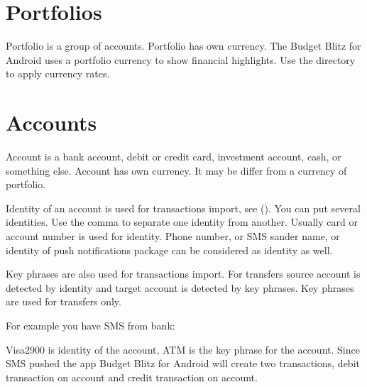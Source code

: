 \documentclass[a4paper,10pt,english]{sphinxmanual}
\begin{document}
\section{Portfolios}
\label{\detokenize{directories:portfolios}}
\sphinxAtStartPar
Portfolio is a group of accounts. Portfolio has own currency. The Budget Blitz for Android uses a portfolio currency
to show financial highlights. Use the  directory to apply currency rates.


\section{Accounts}
\label{\detokenize{directories:accounts}}
\sphinxAtStartPar
Account is a bank account, debit or credit card, investment account, cash, or something else.
Account has own currency. It may be differ from a currency of portfolio.

\sphinxAtStartPar
Identity of an account is used for transactions import, see {\hyperref[\detokenize{import:chapter-import}]{}} ().
You can put several identities. Use the comma to separate one identity from another.
Usually card or account number is used for identity. Phone number, or SMS sander name,
or identity of push notifications package can be considered as identity as well.

\sphinxAtStartPar
Key phrases are also used for transactions import. For transfers source account is detected by identity
and target account is detected by key phrases. Key phrases are used for transfers only.

\sphinxAtStartPar
For example you have SMS from bank:

\begin{sphinxVerbatim}[commandchars=\\\{\}]
           
\end{sphinxVerbatim}

\sphinxAtStartPar
Visa2900 is identity of the  account, ATM is the key phrase for the  account.
Since SMS pushed the app Budget Blitz for Android will create two transactions, debit transaction on  account
and credit transaction on  account.
\end{document}
